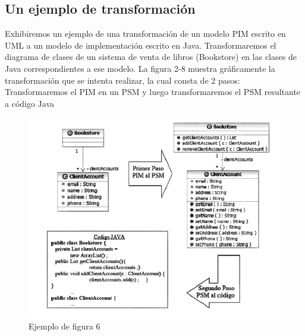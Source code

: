 \subsection{Un ejemplo de transformación}
Exhibiremos un ejemplo de una transformación de un modelo PIM escrito en UML a un modelo de implementación escrito en Java. Transformaremos el diagrama de clases de un sistema de venta de libros (Bookstore) en las clases de Java correspondientes a ese modelo. La figura 2-8 muestra gráficamente la transformación que se intenta realizar, la cual consta de 2 pasos: Transformaremos el PIM en un PSM y luego transformaremos el PSM resultante a código Java

\begin{figure}[H]
\centering
\includegraphics[scale=0.9]{./Imagenes/modelo6}
\caption{Ejemplo de figura 6}
\label{figura6}
\end{figure}

